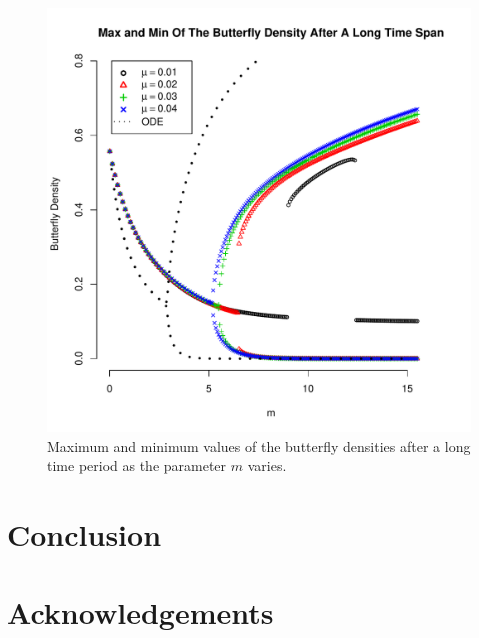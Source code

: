 \documentclass[12pt]{article}
\begin{document}
\begin{figure}[htb]
  \centering
  \includegraphics[width=12cm]{maxMinByM-mu-01-04.pdf}
  \caption[Maximum and minimum values of the butterfly
  density]{Maximum and minimum values of the butterfly densities after
    a long time period as the parameter $m$ varies.}
  \label{fig:maxMinButterflySmallMu}
\end{figure}

\section{Conclusion}

\section{Acknowledgements}



\end{document}
